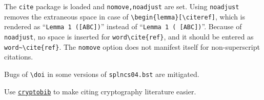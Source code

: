The \texttt{cite} package is loaded and \texttt{nomove,noadjust} are set.
Using \texttt{noadjust} removes the extraneous space
in case of \texttt{\textbackslash begin\{lemma\}[\textbackslash cite{ref}]},
which is rendered as ``\texttt{Lemma 1 ([ABC])}''
instead of ``\texttt{Lemma 1 ( [ABC])}''.
Because of \texttt{noadjust},
no space is inserted for \texttt{word\textbackslash cite\{ref\}},
and it should be entered as
\texttt{word\textasciitilde\textbackslash cite\{ref\}}.
The \texttt{nomove} option does not manifest itself
for non-superscript citations.

Bugs of \texttt{\textbackslash doi}
in some versions of \texttt{splncs04.bst}
are mitigated.

Use \href{https://github.com/cryptobib/export}{\texttt{cryptobib}} to make citing cryptography literature easier.
